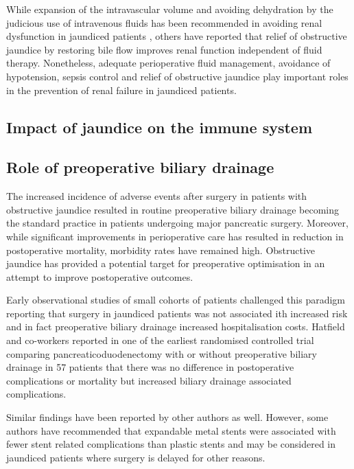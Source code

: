 While expansion of the intravascular volume and avoiding dehydration by the judicious use of intravenous fluids has been recommended in avoiding renal dysfunction in jaundiced patients \parencite{parks_prospective_1994}, others have reported that relief of obstructive jaundice by restoring bile flow improves renal function independent of fluid therapy.\parencite{padillo_randomized_2005} Nonetheless, adequate perioperative fluid management, avoidance of hypotension, sepsis control and relief of obstructive jaundice play important roles in the prevention of renal failure in jaundiced patients.

\subsection{Impact of jaundice on the immune system}

\subsection{Role of preoperative biliary drainage}
The increased incidence of adverse events after surgery in patients with obstructive jaundice resulted in routine preoperative biliary drainage becoming the standard practice in patients undergoing major pancreatic surgery. Moreover, while significant improvements in perioperative care has resulted in reduction in postoperative mortality, morbidity rates have remained high. Obstructive jaundice has provided a potential target for preoperative optimisation in an attempt to improve postoperative outcomes.  

Early observational studies of small cohorts of patients challenged this paradigm reporting that surgery in jaundiced patients was not associated ith increased risk and in fact preoperative biliary drainage increased hospitalisation costs. \parencite{snellen_influence_1985, bakkevold_morbidity_1993, pitt_does_1985} Hatfield and co-workers reported in one of the earliest randomised controlled trial comparing pancreaticoduodenectomy with or without preoperative biliary drainage in 57 patients that there was no difference in postoperative complications or mortality but increased biliary drainage associated complications. \parencite{hatfield_preoperative_1982}

Similar findings have been reported by other authors as well. \parencite{lai_preoperative_1994, lai_preoperative_1994, jagannath_effect_2005} However, some authors have recommended that expandable metal stents were associated with fewer stent related complications than plastic stents and may be considered in jaundiced patients where surgery is delayed for other reasons. \parencite{wasan_use_2005, mullen_pancreaticoduodenectomy_2005}

